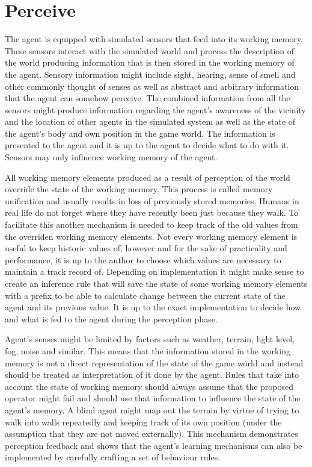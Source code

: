 \section{Perceive}

The agent is equipped with simulated sensors that feed into its working memory.
These sensors interact with the simulated world and process the description of the world producing information that is then stored in the working memory of the agent.
Sensory information might include sight, hearing, sense of smell and other commonly thought of senses as well as abstract and arbitrary information that the agent can somehow perceive.
The combined information from all the sensors might produce information regarding the agent's awareness of the vicinity and the location of other agents in the simulated system as well as the state of the agent's body and own position in the game world.
The information is presented to the agent and it is up to the agent to decide what to do with it.
Sensors may only influence working memory of the agent.

All working memory elements produced as a result of perception of the world override the state of the working memory.
This process is called memory unification and usually results in loss of previously stored memories.
Humans in real life do not forget where they have recently been just because they walk.
To facilitate this another mechanism is needed to keep track of the old values from the overriden working memory elements.
Not every working memory element is useful to keep historic values of, however and for the sake of practicality and performance, it is up to the author to choose which values are necessary to maintain a track record of.
Depending on implementation it might make sense to create an inference rule that will save the state of some working memory elements with a prefix to be able to calculate change between the current state of the agent and its previous value.
It is up to the exact implementation to decide how and what is fed to the agent during the perception phase.

Agent's senses might be limited by factors such as weather, terrain, light level, fog, noise and similar.
This means that the information stored in the working memory is not a direct representation of the state of the game world and instead should be treated as interpretation of it done by the agent.
Rules that take into account the state of working memory should always assume that the proposed operator might fail and should use that information to influence the state of the agent's memory.
A blind agent might map out the terrain by virtue of trying to walk into walls repeatedly and keeping track of its own position (under the assumption that they are not moved externally).
This mechanism demonstrates perception feedback and shows that the agent's learning mechanisms can also be implemented by carefully crafting a set of behaviour rules.

